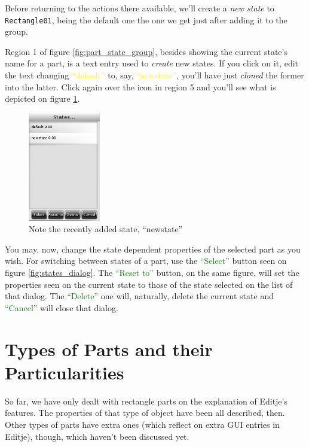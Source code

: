 \documentclass[a4paper]{profusion}
\newcommand{\GUIButton}[1]{\textcolor{green}{#1}} %
\newcommand{\GUIEditable}[1]{\textcolor{yellow}{#1}} %
\begin{document}
Before returning to the actions there available, we'll create a
\emph{new state} to \texttt{Rectangle01}, being the default one the
one we get just after adding it to the group.

Region 1 of figure \ref{fig:part_state_group}, besides showing the
current state's name for a part, is a text entry used to \emph{create}
new states. If you click on it, edit the text changing
\GUIEditable{``default''} to, say, \GUIEditable{``newstate''}, you'll
have just \emph{cloned} the former into the latter. Click again over
the icon in region 5 and you'll see what is depicted on figure
\ref{fig:states_dialog_newstate}.

\begin{figure}[h!]
  \centering
  \includegraphics[width=0.28\textwidth]{images/states_box_newstate.png}
  \caption{Note the recently added state, ``newstate''}
  \label{fig:states_dialog_newstate}
\end{figure}

You may, now, change the state dependent properties of the selected
part as you wish. For switching between states of a part, use the
\GUIButton{``Select''} button seen on figure
\ref{fig:states_dialog}. The \GUIButton{``Reset to''} button, on the
same figure, will set the properties seen on the current state to
those of the state selected on the list of that dialog. The
\GUIButton{``Delete''} one will, naturally, delete the current state
and \GUIButton{``Cancel''} will close that dialog.

\section{Types of Parts and their Particularities}

So far, we have only dealt with rectangle parts on the explanation of
Editje's features. The properties of that type of object have been all
described, then. Other types of parts have extra ones (which reflect
on extra GUI entries in Editje), though, which haven't been discussed
yet.
\end{document}
